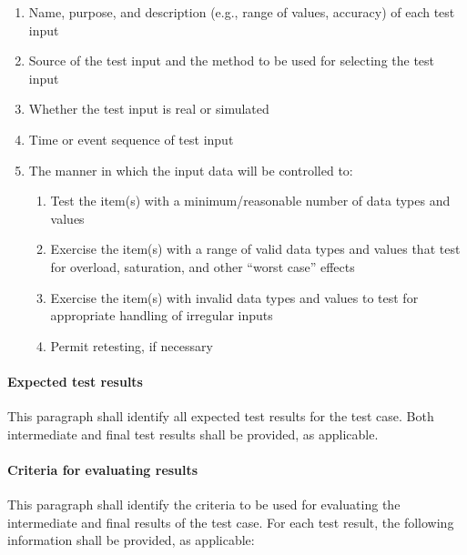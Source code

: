 \documentclass{fidata-report-template}
\begin{document}
\begin{enumerate}
\itemsep1pt\parskip0pt
\item
  Name, purpose, and description (e.g., range of values, accuracy) of
  each test input
\item
  Source of the test input and the method to be used for selecting the
  test input
\item
  Whether the test input is real or simulated
\item
  Time or event sequence of test input
\item
  The manner in which the input data will be controlled to:

  \begin{enumerate}
  \itemsep1pt\parskip0pt
  \item
    Test the item(s) with a minimum/reasonable number of data types and
    values
  \item
    Exercise the item(s) with a range of valid data types and values
    that test for overload, saturation, and other ``worst case'' effects
  \item
    Exercise the item(s) with invalid data types and values to test for
    appropriate handling of irregular inputs
  \item
    Permit retesting, if necessary
  \end{enumerate}
\end{enumerate}

\paragraph{Expected test results}

This paragraph shall identify all expected test results for the test
case. Both intermediate and final test results shall be provided, as
applicable.

\paragraph{Criteria for evaluating results}

This paragraph shall identify the criteria to be used for evaluating the
intermediate and final results of the test case. For each test result,
the following information shall be provided, as applicable:
\end{document}
